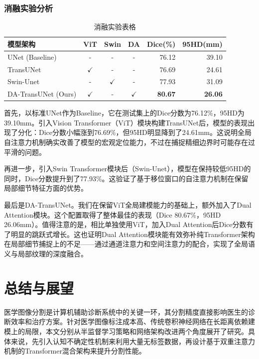 \documentclass{xduugthesis}
\begin{document}
\subsection{消融实验分析}
\begin{table}[htbp]
  \centering
  \caption{消融实验表格}
  \label{tab:ablation_architecture}
  
  \begin{tabular}{|l|c|c|c|r|r|}
    \hline
    \textbf{模型架构} & \textbf{ViT} & \textbf{Swin} & \textbf{DA} & \textbf{Dice(\%)} & \textbf{95HD(mm)} \\
    \hline
    UNet (Baseline) & - & - & - & 76.12 & 39.10 \\
    \hline
    TransUNet & $\checkmark$ & - & - & 76.69 & 24.61 \\
    \hline
    Swin-Unet & - & $\checkmark$ & - & 77.93 & 31.09 \\
    \hline
    DA-TransUNet (Ours) & $\checkmark$ & - & $\checkmark$ & \textbf{80.67} & \textbf{26.06} \\
    \hline
  \end{tabular}
\end{table}

首先，以标准UNet作为Baseline，它在测试集上的Dice分数为76.12\%，95HD为39.10mm。引入Vision Transformer（ViT）模块构建TransUNet后，模型的表现出现了分化：Dice分数小幅涨到76.69\%，但95HD明显降到了24.61mm。这说明全局自注意力机制确实改善了模型的宏观定位能力，不过在捕捉精细边界时可能存在过平滑的问题。

再进一步，引入Swin Transformer模块后（Swin-Unet），模型在保持较低95HD的同时，Dice分数提升到了77.93\%。这验证了基于移位窗口的自注意力机制在保留局部细节特征方面的优势。

最后是DA-TransUNet。我们在保留ViT全局建模能力的基础上，额外加入了Dual Attention模块。这个配置取得了整体最佳的表现（Dice 80.67\%，95HD 26.06mm）。值得注意的是，相比单独使用ViT，加入Dual Attention后Dice分数有了明显的跳跃式增长。这也证明Dual Attention模块能有效弥补纯Transformer架构在局部细节捕捉上的不足——通过通道注意力和空间注意力的配合，实现了全局语义与局部纹理的深度融合。

\chapter{总结与展望}
医学图像分割是计算机辅助诊断系统中的关键一环，其分割精度直接影响医生的诊断效率和治疗方案。针对医学图像标注成本高、传统卷积神经网络在长距离依赖建模上的局限，本文分别从半监督学习策略和网络架构改进两个角度展开了研究。具体来说，先引入认知不确定性机制来利用大量无标签数据，再设计基于双重注意力机制的Transformer混合架构来提升分割性能。
\end{document}
